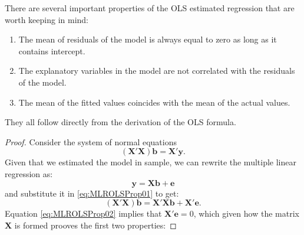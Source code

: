 \documentclass[
]{book}
\providecommand{\tightlist}{%
  \setlength{\itemsep}{0pt}\setlength{\parskip}{0pt}}
\theoremstyle{definition}
\theoremstyle{definition}
\theoremstyle{definition}
\theoremstyle{definition}
\theoremstyle{remark}
\begin{document}
There are several important properties of the OLS estimated regression that are worth keeping in mind:

\begin{enumerate}
\def\labelenumi{\arabic{enumi}.}
\tightlist
\item
  The mean of residuals of the model is always equal to zero as long as it contains intercept.
\item
  The explanatory variables in the model are not correlated with the residuals of the model.
\item
  The mean of the fitted values coincides with the mean of the actual values.
\end{enumerate}

They all follow directly from the derivation of the OLS formula.

\begin{proof}
Consider the system of normal equations
\begin{equation}
    \left(\mathbf{X}' \mathbf{X}\right) \mathbf{b} = \mathbf{X}' \mathbf{y} .
    \label{eq:MLROLSProp01}
\end{equation}
Given that we estimated the model in sample, we can rewrite the multiple linear regression as:
\begin{equation*}
    \mathbf{y} = \mathbf{X} \boldsymbol{b} + \boldsymbol{e} 
\end{equation*}
and substitute it in \eqref{eq:MLROLSProp01} to get:
\begin{equation}
    \left(\mathbf{X}' \mathbf{X}\right) \mathbf{b} = \mathbf{X}' \mathbf{X} \boldsymbol{b} + \mathbf{X}' \boldsymbol{e} .
    \label{eq:MLROLSProp02}
\end{equation}
Equation \eqref{eq:MLROLSProp02} implies that \(\mathbf{X}' \boldsymbol{e}=0\), which given how the matrix \(\mathbf{X}\) is formed prooves the first two properties:


\end{proof}
\end{document}
